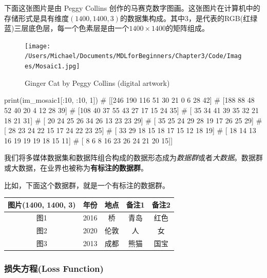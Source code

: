\documentclass[12pt]{article}
\numberwithin{equation}{section}
\numberwithin{figure}{section}
\begin{document}
\begin{example}
下面这张图片是由 Peggy Collins 创作的马赛克数字图画。这张图片在计算机中的存储形式是具有维度$(1400, 1400, 3)$的数据集构成。其中3，是代表的RGB(红绿蓝)三层底色层，每一个色素层是由一个$1400 \times 1400$的矩阵组成。
\begin{figure}[H]
	\centering
	\texttt{[image: /Users/Michael/Documents/MDLforBeginners/Chapter3/Code/Images/Mosaic1.jpg]}
	\caption{Ginger Cat by Peggy Collins (digital artwork)}
\end{figure}	
\begin{python}
print(im_mosaic1[:10, :10, 1])
# [[246 190 116  51  30  21   0   6  28  42]
#  [188  88  48  52  40  20   4  12  28  39]
#  [108  40  37  55  43  27  17  15  24  35]
#  [ 35  34  41  39  35  32  21  18  21  31]
#  [ 20  24  25  26  34  26  13  23  23  29]
#  [ 35  25  24  29  28  19  17  26  25  29]
#  [ 28  23  24  22  15  17  24  22  23  25]
#  [ 33  29  18  15  18  17  15  12  18  19]
#  [ 18  14  13  16  19  19  19  18  15  11]
#  [  8   6   8  16  23  26  24  21  20  15]]	
\end{python}
\end{example}

\begin{definition}
	我们将多媒体数据集和数据阵组合构成的数据形态成为\textit{数据群}或者\textit{大数据}。数据群或大数据，在业界也被称为\textbf{有标注的数据群}。
\end{definition}

\begin{example}
比如，下面这个数据群，就是一个有标注的数据群。
\begin{table}[H]
	\centering
	\renewcommand{\arraystretch}{1.5}
	\begin{tabular}{ccccc}
	\hline 
		图片(1400, 1400, 3) & 年份 & 地点 & 备注1 & 备注2 \\
		\hline 
		图1 & 2016 & 桥 & 青岛 & 红色 \\
		图2 & 2020 &  伦敦 & 人 & 女 \\
		图3 & 2013 & 成都& 熊猫 & 国宝\\
		\hline 
	\end{tabular}
\end{table}
\end{example}


\subsubsection{损失方程(Loss Function)}
\end{document}
